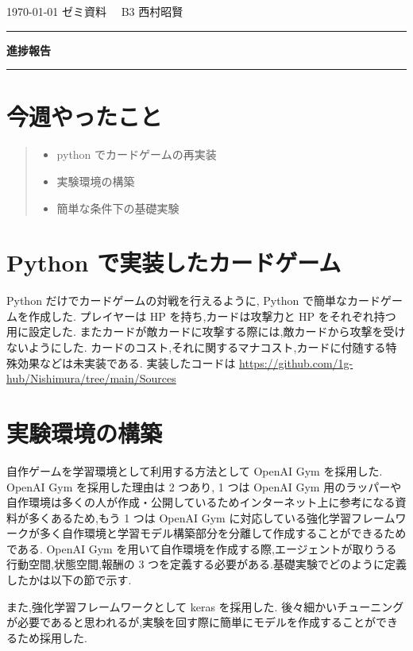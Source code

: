 \documentclass{jarticle}     %
\begin{document}
  \noindent
  \onecolumn
  \hspace{1em}

  \today
  ゼミ資料
  \hfill
  \ \ B3 西村昭賢 

  \vspace{2mm}
  \hrule
  \begin{center}
  {\Large \bf 進捗報告}
  \end{center}
  \hrule
  \vspace{3mm}


\section{今週やったこと}

\begin{quote}
  \begin{itemize}
   \item python でカードゲームの再実装
   \item 実験環境の構築
   \item 簡単な条件下の基礎実験
  \end{itemize}
 \end{quote}

\section{Python で実装したカードゲーム}
 Python だけでカードゲームの対戦を行えるように, Python で簡単なカードゲームを作成した.
 プレイヤーは HP を持ち,カードは攻撃力と HP をそれぞれ持つ用に設定した.
 またカードが敵カードに攻撃する際には,敵カードから攻撃を受けないようにした.
 カードのコスト,それに関するマナコスト,カードに付随する特殊効果などは未実装である.
 実装したコードは \url{https://github.com/1g-hub/Nishimura/tree/main/Sources}

\section{実験環境の構築}
自作ゲームを学習環境として利用する方法として OpenAI Gym を採用した.
OpenAI Gym を採用した理由は 2 つあり, 1 つは OpenAI Gym 用のラッパーや自作環境は多くの人が作成・公開しているためインターネット上に参考になる資料が多くあるため,もう 1 つは OpenAI Gym に対応している強化学習フレームワークが多く自作環境と学習モデル構築部分を分離して作成することができるためである\cite{OpenAI}.
OpenAI Gym を用いて自作環境を作成する際,エージェントが取りうる行動空間,状態空間,報酬の 3 つを定義する必要がある.基礎実験でどのように定義したかは以下の節で示す.
\par
また,強化学習フレームワークとして keras を採用した.
後々細かいチューニングが必要であると思われるが,実験を回す際に簡単にモデルを作成することができるため採用した.
\end{document}
